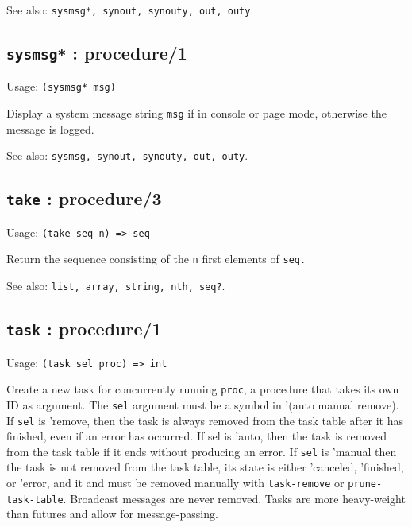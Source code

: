 \documentclass[
]{article}
\newcommand{\passthrough}[1]{#1}
\begin{document}
See also: \passthrough{\lstinline!sysmsg*, synout, synouty, out, outy!}.

\hypertarget{sysmsg-procedure1-3}{%
\subsection{\texorpdfstring{\texttt{sysmsg*} :
procedure/1}{sysmsg* : procedure/1}}\label{sysmsg-procedure1-3}}

Usage: \passthrough{\lstinline!(sysmsg* msg)!}

Display a system message string \passthrough{\lstinline!msg!} if in
console or page mode, otherwise the message is logged.

See also: \passthrough{\lstinline!sysmsg, synout, synouty, out, outy!}.

\hypertarget{take-procedure3-1}{%
\subsection{\texorpdfstring{\texttt{take} :
procedure/3}{take : procedure/3}}\label{take-procedure3-1}}

Usage: \passthrough{\lstinline!(take seq n) => seq!}

Return the sequence consisting of the \passthrough{\lstinline!n!} first
elements of \passthrough{\lstinline!seq.!}

See also: \passthrough{\lstinline!list, array, string, nth, seq?!}.

\hypertarget{task-procedure1-2}{%
\subsection{\texorpdfstring{\texttt{task} :
procedure/1}{task : procedure/1}}\label{task-procedure1-2}}

Usage: \passthrough{\lstinline!(task sel proc) => int!}

Create a new task for concurrently running
\passthrough{\lstinline!proc!}, a procedure that takes its own ID as
argument. The \passthrough{\lstinline!sel!} argument must be a symbol in
'(auto manual remove). If \passthrough{\lstinline!sel!} is 'remove, then
the task is always removed from the task table after it has finished,
even if an error has occurred. If sel is 'auto, then the task is removed
from the task table if it ends without producing an error. If
\passthrough{\lstinline!sel!} is 'manual then the task is not removed
from the task table, its state is either 'canceled, 'finished, or
'error, and it and must be removed manually with
\passthrough{\lstinline!task-remove!} or
\passthrough{\lstinline!prune-task-table!}. Broadcast messages are never
removed. Tasks are more heavy-weight than futures and allow for
message-passing.
\end{document}
